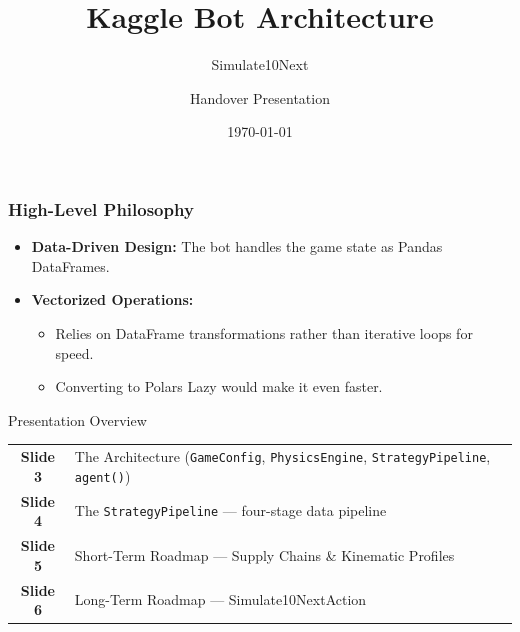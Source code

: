 \documentclass[aspectratio=169]{beamer}
\title{Kaggle Bot Architecture}
\subtitle{Simulate10Next}
\author{Handover Presentation}
\date{\today}
\begin{document}
\frame{\titlepage}

\begin{frame}
    \frametitle{High-Level Philosophy}
    \begin{itemize}
        \item \textbf{Data-Driven Design:} The bot handles the game state as Pandas DataFrames.
        \item \textbf{Vectorized Operations:}
        \begin{itemize}
            \item Relies on DataFrame transformations rather than iterative loops for speed.
            \item Converting to Polars Lazy would make it even faster.
        \end{itemize}
    \end{itemize}

    \vspace{0.4cm}
    \begin{block}{Presentation Overview}
        \begin{tabular}{cl}
            \textbf{Slide 3} & The Architecture (\texttt{GameConfig}, \texttt{PhysicsEngine}, \texttt{StrategyPipeline}, \texttt{agent()}) \\[2pt]
            \textbf{Slide 4} & The \texttt{StrategyPipeline} --- four-stage data pipeline \\[2pt]
            \textbf{Slide 5} & Short-Term Roadmap --- Supply Chains \& Kinematic Profiles \\[2pt]
            \textbf{Slide 6} & Long-Term Roadmap --- Simulate10NextAction \\
        \end{tabular}
    \end{block}
\end{frame}
\end{document}
